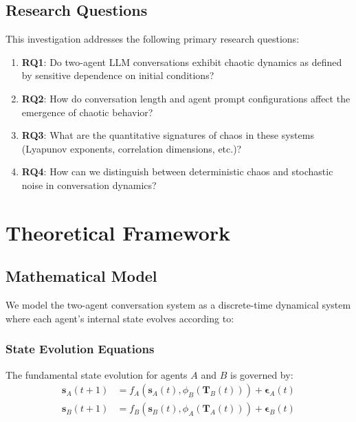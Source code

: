 \documentclass[11pt,a4paper]{article}
\begin{document}
\subsection{Research Questions}

This investigation addresses the following primary research questions:
\begin{enumerate}
    \item \textbf{RQ1}: Do two-agent LLM conversations exhibit chaotic dynamics as defined by sensitive dependence on initial conditions?
    \item \textbf{RQ2}: How do conversation length and agent prompt configurations affect the emergence of chaotic behavior?
    \item \textbf{RQ3}: What are the quantitative signatures of chaos in these systems (Lyapunov exponents, correlation dimensions, etc.)?
    \item \textbf{RQ4}: How can we distinguish between deterministic chaos and stochastic noise in conversation dynamics?
\end{enumerate}

\section{Theoretical Framework}

\subsection{Mathematical Model}

We model the two-agent conversation system as a discrete-time dynamical system where each agent's internal state evolves according to:

\subsubsection{State Evolution Equations}

The fundamental state evolution for agents $A$ and $B$ is governed by:
\begin{align}
\mathbf{s}_A(t+1) &= f_A(\mathbf{s}_A(t), \phi_B(\mathbf{T}_B(t))) + \boldsymbol{\epsilon}_A(t) \\
\mathbf{s}_B(t+1) &= f_B(\mathbf{s}_B(t), \phi_A(\mathbf{T}_A(t))) + \boldsymbol{\epsilon}_B(t)
\end{align}
\end{document}
